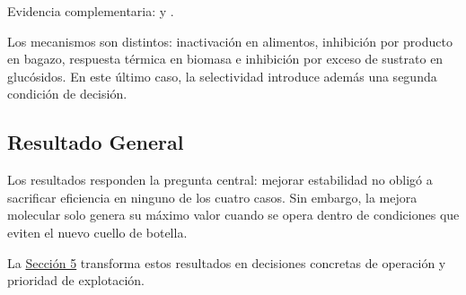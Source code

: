 \noindent\small
Evidencia complementaria:
 y
.
\normalsize

Los mecanismos son distintos: inactivación en alimentos, inhibición por producto
en bagazo, respuesta térmica en biomasa e inhibición por exceso de sustrato en
glucósidos. En este último caso, la selectividad introduce además una segunda
condición de decisión.

\subsection{Resultado General}
\label{subsec:resultado_general}

Los resultados responden la pregunta central: mejorar estabilidad no obligó a
sacrificar eficiencia en ninguno de los cuatro casos. Sin embargo, la mejora
molecular solo genera su máximo valor cuando se opera dentro de condiciones que
eviten el nuevo cuello de botella.

La \hyperref[sec:discusion]{Sección 5} transforma estos resultados en decisiones
concretas de operación y prioridad de explotación.
